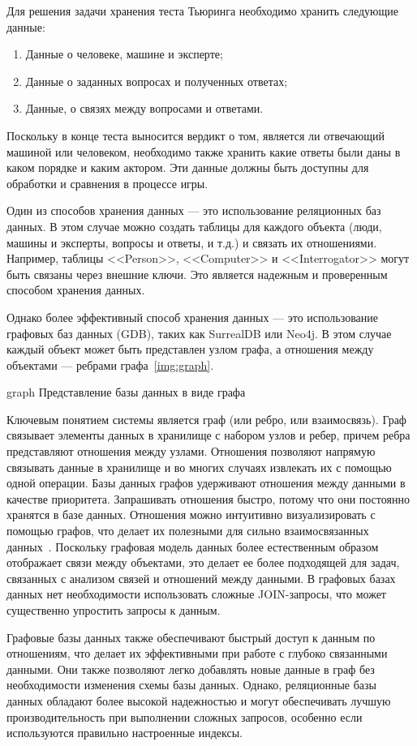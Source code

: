 Для решения задачи хранения теста Тьюринга необходимо хранить следующие данные:
\begin{enumerate}  
  \item Данные о человеке, машине и эксперте;
  \item Данные о заданных вопросах и полученных ответах;
  \item Данные, о связях между вопросами и ответами. 
\end{enumerate}

Поскольку в конце теста выносится вердикт о том, является ли отвечающий машиной или человеком, необходимо также хранить какие ответы были даны в каком порядке и каким актором. 
Эти данные должны быть доступны для обработки и сравнения в процессе игры.
 
Один из способов хранения данных --- это использование реляционных баз данных. В этом случае можно создать таблицы для каждого объекта (люди, машины и эксперты, вопросы и ответы, и т.д.) и связать их отношениями. 
Например, таблицы <<Person>>, <<Computer>> и <<Interrogator>> могут быть связаны через внешние ключи. 
Это является надежным и проверенным способом хранения данных.

Однако более эффективный способ хранения данных --- это использование графовых баз данных (GDB), таких как SurrealDB или Neo4j. 
В этом случае каждый объект может быть представлен узлом графа, а отношения между объектами --- ребрами графа~\ref{img:graph}.

\img{100mm}
{graph}
{Представление базы данных в виде графа}

Ключевым понятием системы является граф (или ребро, или взаимосвязь). Граф связывает элементы данных в хранилище с набором узлов и ребер, причем ребра представляют отношения между узлами. Отношения позволяют напрямую связывать данные в хранилище и во многих случаях извлекать их с помощью одной операции. Базы данных графов удерживают отношения между данными в качестве приоритета. Запрашивать отношения быстро, потому что они постоянно хранятся в базе данных. Отношения можно интуитивно визуализировать с помощью графов, что делает их полезными для сильно взаимосвязанных данных~\cite{graph-exp}.
Поскольку графовая модель данных более естественным образом отображает связи между объектами, это делает ее более подходящей для задач, связанных с анализом связей и отношений между данными. В графовых базах данных нет необходимости использовать сложные JOIN-запросы, что может существенно упростить запросы к данным.

Графовые базы данных также обеспечивают быстрый доступ к данным по отношениям, что делает их эффективными при работе с глубоко связанными данными. Они также позволяют легко добавлять новые данные в граф без необходимости изменения схемы базы данных.
Однако, реляционные базы данных обладают более высокой надежностью и могут обеспечивать лучшую производительность при выполнении сложных запросов, особенно если используются правильно настроенные индексы.


